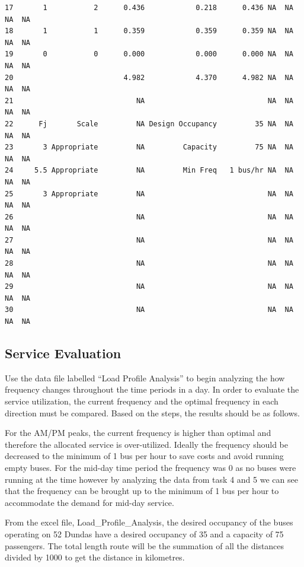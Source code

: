\documentclass[
11pt, %
oneside, %
english, %
singlespacing, %
]{macthesis} %
\begin{document}
\begin{verbatim}
17       1           2      0.436            0.218      0.436 NA  NA  NA  NA
18       1           1      0.359            0.359      0.359 NA  NA  NA  NA
19       0           0      0.000            0.000      0.000 NA  NA  NA  NA
20                          4.982            4.370      4.982 NA  NA  NA  NA
21                             NA                             NA  NA  NA  NA
22      Fj       Scale         NA Design Occupancy         35 NA  NA  NA  NA
23       3 Appropriate         NA         Capacity         75 NA  NA  NA  NA
24     5.5 Appropriate         NA         Min Freq   1 bus/hr NA  NA  NA  NA
25       3 Appropriate         NA                             NA  NA  NA  NA
26                             NA                             NA  NA  NA  NA
27                             NA                             NA  NA  NA  NA
28                             NA                             NA  NA  NA  NA
29                             NA                             NA  NA  NA  NA
30                             NA                             NA  NA  NA  NA
\end{verbatim}
\hypertarget{service-evaluation}{%
\subsection{Service Evaluation}\label{service-evaluation}}

Use the data file labelled ``Load Profile Analysis'' to begin analyzing the how frequency changes throughout the time periods in a day. In order to evaluate the service utilization, the current frequency and the optimal frequency in each direction must be compared. Based on the steps, the results should be as follows.

For the AM/PM peaks, the current frequency is higher than optimal and therefore the allocated service is over-utilized. Ideally the frequency should be decreased to the minimum of 1 bus per hour to save costs and avoid running empty buses. For the mid-day time period the frequency was 0 as no buses were running at the time however by analyzing the data from task 4 and 5 we can see that the frequency can be brought up to the minimum of 1 bus per hour to accommodate the demand for mid-day service.

From the excel file, Load\_Profile\_Analysis, the desired occupancy of the buses operating on 52 Dundas have a desired occupancy of 35 and a capacity of 75 passengers. The total length route will be the summation of all the distances divided by 1000 to get the distance in kilometres.
\end{document}

